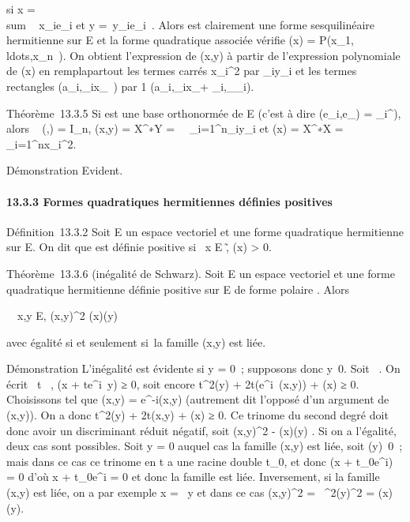 \documentclass[]{article}
\begin{document}
si x = \\sum ~
x\_ie\_i et y =\
\sum  y\_ie\_i~. Alors \phi est
clairement une forme sesquilinéaire hermitienne sur E et la forme
quadratique associée vérifie \Phi(x) =
P(x\_1,\\ldots,x\_n~).
On obtient l'expression de \phi(x,y) à partir de l'expression polynomiale
de \Phi(x) en rempla\ccant partout les termes carrés
\textbar{}x\_i\textbar{}^2 par
\overlinex\_iy\_i et les termes
rectangles
\mathrmRe(a\_i,\jmath\overlinex\_ix\_\jmath~)
par  1 
(a\_i,\jmath\overlinex\_ix\_\jmath +
\overlinea\_i,\jmath\overlinex\_\jmathy\_i).

Théorème~13.3.5 Si  est une base orthonormée de E (c'est à dire
\phi(e\_i,e\_\jmath) = \delta\_i^\jmath), alors
\mathrmMat~ (\phi,) =
I\_n, \phi(x,y) = X^∗Y =\
\sum ~
\_i=1^n\overlinex\_iy\_i
et \Phi(x) = X^∗X =\
\sum ~
\_i=1^n\textbar{}x\_i\textbar{}^2.

Démonstration Evident.

\paragraph{13.3.3 Formes quadratiques hermitiennes définies positives}

Définition~13.3.2 Soit E un  espace vectoriel et \Phi une forme
quadratique hermitienne sur E. On dit que \Phi est définie positive si
\forall~x \in E \diagdown\0\~,
\Phi(x) \textgreater{} 0.

Théorème~13.3.6 (inégalité de Schwarz). Soit E un  espace vectoriel et
\Phi une forme quadratique hermitienne définie positive sur E de forme
polaire \phi. Alors

\forall~~x,y \in E,
\textbar{}\phi(x,y)\textbar{}^2 \leq \Phi(x)\Phi(y)

avec égalité si et seulement si~la famille (x,y) est liée.

Démonstration L'inégalité est évidente si y = 0~; supposons donc
y\neq~0. Soit \theta \in \mathbb{R}~. On écrit
\forall~t \in {}~, \Phi(x + te^i\theta~y) ≥ 0, soit
encore t^2\Phi(y) +
2t\mathrmRe(e^i\theta~\phi(x,y))
+ \Phi(x) ≥ 0. Choisissons \theta tel que \phi(x,y) =
e^-i\theta\textbar{}\phi(x,y)\textbar{} (autrement dit l'opposé d'un
argument de \phi(x,y)). On a donc t^2\Phi(y) +
2t\textbar{}\phi(x,y)\textbar{} + \Phi(x) ≥ 0. Ce trinome du second degré doit
donc avoir un discriminant réduit négatif, soit
\textbar{}\phi(x,y)\textbar{}^2 - \Phi(x)\Phi(y) . Si on a
l'égalité, deux cas sont possibles. Soit y = 0 auquel cas la famille
(x,y) est liée, soit \Phi(y)\neq~0~; mais dans ce
cas ce trinome en t a une racine double t\_0, et donc \Phi(x +
t\_0e^i\thetay) = 0 d'où x + t\_0e^i\thetay
= 0 et donc la famille est liée. Inversement, si la famille (x,y) est
liée, on a par exemple x = \lambda~y et dans ce cas
\textbar{}\phi(x,y)\textbar{}^2 =
\textbar{}\lambda~^2\textbar{}\Phi(y)^2 = \Phi(x)\Phi(y).
\end{document}
